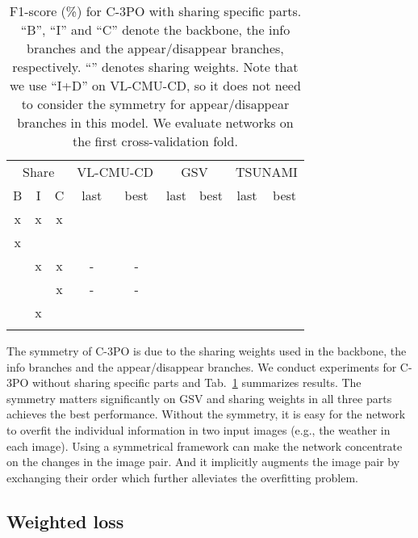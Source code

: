 \documentclass[review]{elsarticle}
\newcommand{\cmark}{\checkmark}\newcommand{\xmark}{\sffamily x}
\begin{document}
\begin{table}
  \centering
  \small
  \caption{F1-score (\%) for C-3PO with sharing specific parts. ``B'', ``I'' and ``C'' denote the backbone, the info branches and the appear/disappear branches, respectively. ``\cmark'' denotes sharing weights. Note that we use ``I+D'' on VL-CMU-CD, so it does not need to consider the symmetry for appear/disappear branches in this model. We evaluate networks on the first cross-validation fold.}
  \begin{tabular}{ccccccccc}
    \hline
    \multicolumn{3}{c}{Share} & \multicolumn{2}{c}{VL-CMU-CD} & \multicolumn{2}{c}{GSV} & \multicolumn{2}{c}{TSUNAMI} \\
    B & I & C & last & best & last & best & last & best \\
    \hline
    \xmark & \xmark & \xmark &  &   &  &  &  & \\
    \xmark & \cmark & \cmark &  &   &  &  &  & \\
    \cmark & \xmark & \xmark & - & - &  &  &  &  \\
    \cmark & \cmark & \xmark & - & - &  &  &  &  \\
    \cmark & \xmark & \cmark &  &  &  &  &  &  \\
    \cmark & \cmark & \cmark &  &  &  &  &  &  \\
    \hline
  \end{tabular}
  \label{tab:symmetry}
\end{table}

The symmetry of C-3PO is due to the sharing weights used in the backbone, the info branches and the appear/disappear branches. We conduct experiments for C-3PO without sharing specific parts and Tab.~\ref{tab:symmetry} summarizes results. The symmetry matters significantly on GSV and sharing weights in all three parts achieves the best performance. Without the symmetry, it is easy for the network to overfit the individual information in two input images (e.g., the weather in each image). Using a symmetrical framework can make the network concentrate on the changes in the image pair. And it implicitly augments the image pair by exchanging their order which further alleviates the overfitting problem.

\subsection{Weighted loss}
\label{sec:weighted-loss}
\end{document}
